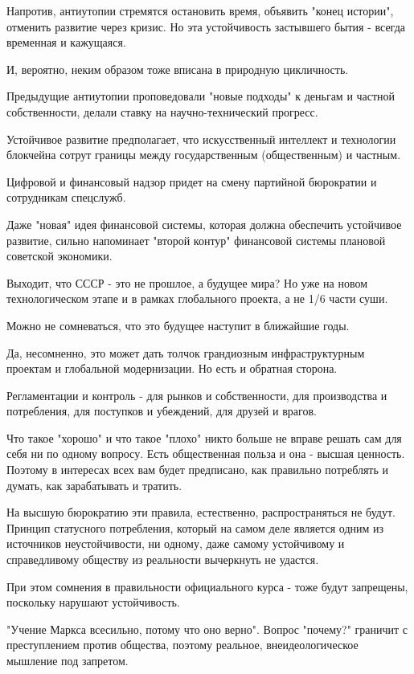 Напротив, антиутопии стремятся остановить время, объявить "конец истории",
отменить развитие через кризис.  Но эта устойчивость застывшего бытия  - всегда
временная и кажущаяся.

И, вероятно, неким образом тоже вписана в природную цикличность.

Предыдущие антиутопии проповедовали "новые подходы" к деньгам и частной
собственности, делали ставку на научно-технический прогресс. 

Устойчивое развитие предполагает, что искусственный интеллект и технологии
блокчейна сотрут границы между государственным (общественным) и частным. 

 Цифровой и финансовый надзор придет на смену партийной бюрократии и
 сотрудникам спецслужб.

	Даже "новая" идея финансовой системы, которая должна обеспечить устойчивое
	развитие, сильно напоминает  "второй контур" финансовой системы плановой
	советской экономики.

Выходит, что СССР - это не прошлое, а будущее мира? Но уже на новом
технологическом этапе и в рамках глобального проекта, а не 1/6 части суши.

Можно не сомневаться, что это будущее наступит в ближайшие годы. 

Да, несомненно, это может дать толчок грандиозным инфраструктурным проектам и
глобальной модернизации. Но есть и обратная сторона.

Регламентации и контроль -  для рынков и собственности,  для производства и
потребления, для поступков и убеждений, для друзей и врагов. 

Что такое "хорошо" и что такое "плохо" никто больше не вправе решать сам для
себя ни по одному вопросу. Есть общественная польза и она - высшая ценность.
Поэтому в интересах всех вам будет предписано, как правильно  потреблять и
думать, как зарабатывать и тратить.

На высшую бюрократию эти правила, естественно, распространяться не будут.
Принцип статусного потребления, который на самом деле  является одним из
источников неустойчивости, ни одному, даже самому устойчивому и справедливому
обществу из реальности вычеркнуть не удастся.

При этом сомнения в правильности официального курса - тоже будут запрещены,
поскольку нарушают устойчивость.

"Учение Маркса всесильно, потому что оно верно". Вопрос "почему?" граничит с
преступлением против общества, поэтому реальное, внеидеологическое мышление под
запретом.

